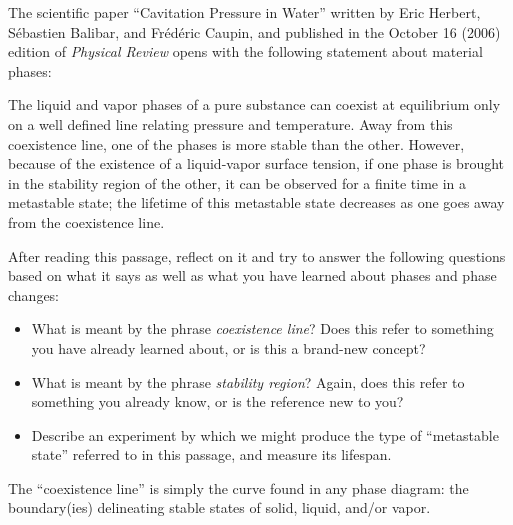 

The scientific paper ``Cavitation Pressure in Water'' written by Eric Herbert, S\'ebastien Balibar, and Fr\'ed\'eric Caupin, and published in the October 16 (2006) edition of {\it Physical Review} opens with the following statement about material phases:

\vskip 10pt {\narrower \noindent \baselineskip5pt

The liquid and vapor phases of a pure substance can coexist at equilibrium only on a well defined line relating pressure and temperature.  Away from this coexistence line, one of the phases is more stable than the other.  However, because of the existence of a liquid-vapor surface tension, if one phase is brought in the stability region of the other, it can be observed for a finite time in a metastable state; the lifetime of this metastable state decreases as one goes away from the coexistence line.

\par} \vskip 10pt

After reading this passage, reflect on it and try to answer the following questions based on what it says as well as what you have learned about phases and phase changes:

\begin{itemize}
\item{} What is meant by the phrase {\it coexistence line}?  Does this refer to something you have already learned about, or is this a brand-new concept?
\vskip 5pt
\item{} What is meant by the phrase {\it stability region}?  Again, does this refer to something you already know, or is the reference new to you?
\vskip 5pt
\item{} Describe an experiment by which we might produce the type of ``metastable state'' referred to in this passage, and measure its lifespan.
\end{itemize}







The ``coexistence line'' is simply the curve found in any phase diagram: the boundary(ies) delineating stable states of solid, liquid, and/or vapor.

